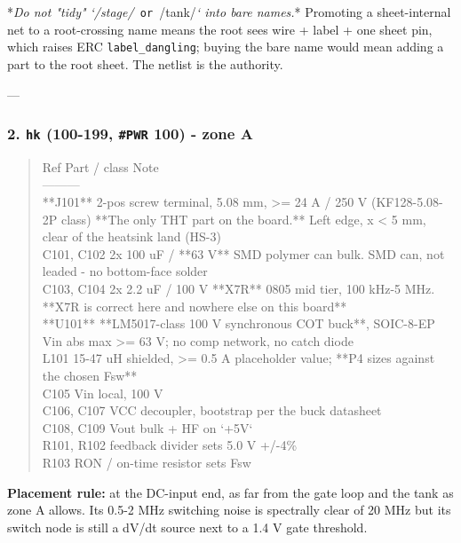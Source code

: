 \documentclass[11pt,a4paper]{article}
\begin{document}
{*}\emph{Do not "tidy" `/stage/}\texttt{ or }/tank/\emph{` into bare names.}{*} Promoting a sheet-internal net to a root-crossing name means the root sees wire + label + one sheet pin, which raises ERC \texttt{label\_dangling}; buying the bare name would mean adding a part to the root sheet. The netlist is the authority.

---

\subsubsection*{2. \texttt{hk} (100-199, \texttt{\#PWR} 100) - zone A}
\begin{quote}\small\ttfamily\raggedright
\textbar{} Ref \textbar{} Part / class \textbar{} Note \textbar{}\\
\textbar{}---\textbar{}---\textbar{}---\textbar{}\\
\textbar{} {*}{*}J101{*}{*} \textbar{} 2-pos screw terminal, 5.08 mm, \textgreater{}= 24 A / 250 V (KF128-5.08-2P class) \textbar{} {*}{*}The only THT part on the board.{*}{*} Left edge, x \textless{} 5 mm, clear of the heatsink land (HS-3) \textbar{}\\
\textbar{} C101, C102 \textbar{} 2x 100 uF / {*}{*}63 V{*}{*} SMD polymer can \textbar{} bulk. SMD can, not leaded - no bottom-face solder \textbar{}\\
\textbar{} C103, C104 \textbar{} 2x 2.2 uF / 100 V {*}{*}X7R{*}{*} 0805 \textbar{} mid tier, 100 kHz-5 MHz. {*}{*}X7R is correct here and nowhere else on this board{*}{*} \textbar{}\\
\textbar{} {*}{*}U101{*}{*} \textbar{} {*}{*}LM5017-class 100 V synchronous COT buck{*}{*}, SOIC-8-EP \textbar{} Vin abs max \textgreater{}= 63 V; no comp network, no catch diode \textbar{}\\
\textbar{} L101 \textbar{} 15-47 uH shielded, \textgreater{}= 0.5 A \textbar{} placeholder value; {*}{*}P4 sizes against the chosen Fsw{*}{*} \textbar{}\\
\textbar{} C105 \textbar{} Vin local, 100 V \textbar{} \textbar{}\\
\textbar{} C106, C107 \textbar{} VCC decoupler, bootstrap \textbar{} per the buck datasheet \textbar{}\\
\textbar{} C108, C109 \textbar{} Vout bulk + HF on `+5V` \textbar{} \textbar{}\\
\textbar{} R101, R102 \textbar{} feedback divider \textbar{} sets 5.0 V +/-4\% \textbar{}\\
\textbar{} R103 \textbar{} RON / on-time resistor \textbar{} sets Fsw \textbar{}
\end{quote}
\textbf{Placement rule:} at the DC-input end, as far from the gate loop and the tank as zone A allows. Its 0.5-2 MHz switching noise is spectrally clear of 20 MHz but its switch node is still a dV/dt source next to a 1.4 V gate threshold.
\end{document}
